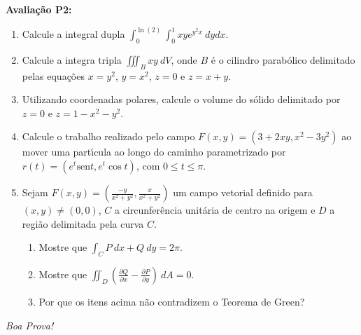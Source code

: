 \documentclass[a4paper,5pt]{amsbook}
\newcommand{\sen}{\text{sen}}
\newcommand{\ds}{\displaystyle}
\begin{document}
\textbf{Avalia\c{c}\~ao P2:}
\begin{enumerate}
\item Calcule a integral dupla $\ds\int_0^{\ln(2)} \int_0^1 xye^{y^2x}\ dy dx$.
\vspace{0.5cm}

\item Calcule a integra tripla $\ds\iiint_B xy\ dV$, onde $B$ \'e
	o cilindro parab\'olico delimitado pelas equa\c{c}\~oes $x=y^2$, $y=x^2$, $z=0$ e
	$z=x+y$.
\vspace{0.5cm}

\item Utilizando coordenadas polares, calcule o volume do s\'olido delimitado por
	$z=0$ e $z=1-x^2-y^2$.
\vspace{0.5cm}

\item Calcule o trabalho realizado pelo campo $F(x,y) = (3+2xy, x^2-3y^2)$ ao
	mover uma part\'{\i}cula ao longo do caminho parametrizado por $r(t) = (e^t\sen
	t, e^t\cos t)$, com $0\le t \le \pi$.
\vspace{0.5cm}

\item Sejam $\ds F(x,y)=\left(\frac{-y}{x^2+y^2}, \frac{x}{x^2+y^2}\right)$ um
	campo vetorial definido para $(x,y)\neq(0,0)$, $C$ a circunfer\^encia
	unit\'aria de centro na origem e $D$ a regi\~ao delimitada pela curva $C$.
	\begin{enumerate}
		\item Mostre que $\ds \int_C P\ dx + Q\ dy = 2\pi$.
		\item Mostre que $\ds \iint_D \left(\frac{\partial Q}{\partial x} -
				\frac{\partial P}{\partial y}\right)\ dA = 0$.
		\item Por que os itens acima n\~ao contradizem o Teorema de Green?
	\end{enumerate}
\end{enumerate}

\begin{flushright}
	\textit{Boa Prova!}
\end{flushright}
\end{document}
